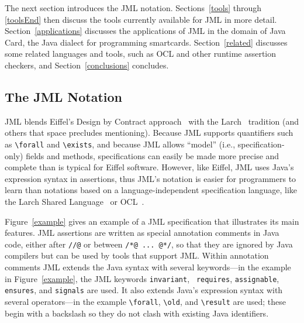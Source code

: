 \medskip

The next section introduces the JML notation.  Sections~\ref{tools}
through \ref{toolsEnd} then discuss the tools currently available for
JML in more detail.  Section~\ref{applications} discusses the
applications of JML in the domain of Java Card, the Java dialect for
programming smartcards.  Section~\ref{related} discusses some related
languages and tools, such as OCL and other runtime assertion checkers,
and Section~\ref{conclusions} concludes.

\subsection{The JML Notation}
\label{notation}

JML blends Eiffel's Design by Contract approach~\cite{Meyer97} with
the Larch~\cite{Guttag-Horning93} tradition (and others that space
precludes mentioning).  Because JML supports quantifiers such as
\verb_\forall_ and \verb_\exists_, and because JML allows ``model''
(i.e., specification-only) fields and methods, specifications can
easily be made more precise and complete than is typical for Eiffel software.
However, like Eiffel, JML uses Java's expression syntax in assertions,
thus JML's notation is easier for programmers to learn than notations
based on a language-independent specification language, like the Larch Shared
Language~\cite{Leavens-Baker-Ruby03,Leavens-etal03a} or
OCL~\cite{WarmerKleppe99}.


\begin{figure*}
{\small
}
\caption{\label{example}Example JML specification}
\end{figure*}

Figure~\ref{example} gives an example of a JML specification that
illustrates its main features.  JML assertions are written as special
annotation comments in Java code,
either after \verb_//@_ or between \verb_/*@ ... @*/_,
so that they are ignored by Java compilers but can be used
by tools that support JML\@.  Within annotation comments JML extends the
Java syntax with several keywords---in the example in
Figure~\ref{example}, the JML keywords {\tt invariant}, {\tt
  requires}, {\tt assignable}, {\tt ensures}, and {\tt signals} are
used.  It also extends Java's expression syntax with several
operators---in the example \verb_\forall_, \verb_\old_, and
\verb_\result_ are used; these begin with a backslash so they do not
clash with existing Java identifiers.

